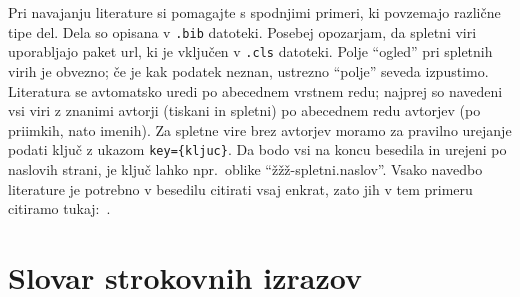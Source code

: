 \documentclass[mat1]{fmfdelo}
\begin{document}
Pri navajanju literature si pomagajte s spodnjimi primeri, ki povzemajo različne tipe del. Dela so opisana v \verb|.bib| datoteki.
Posebej opozarjam, da spletni viri uporabljajo paket url, ki je vključen v \verb|.cls| datoteki. Polje ``ogled'' pri spletnih virih je obvezno; če je kak podatek neznan, ustrezno ``polje'' seveda izpustimo. Literatura se avtomatsko uredi po abecednem vrstnem redu; najprej so navedeni vsi viri z znanimi avtorji (tiskani in spletni)  po abecednem redu avtorjev (po priimkih, nato imenih). Za spletne vire brez avtorjev moramo za pravilno urejanje podati ključ z ukazom \verb|key={kljuc}|. Da bodo vsi na koncu besedila in urejeni po naslovih strani, je ključ lahko npr.~oblike ``žžž-spletni.naslov''. 
Vsako navedbo literature je potrebno v besedilu citirati vsaj enkrat, zato jih v tem primeru citiramo tukaj:~\cite{angelini2011straight,globevniSkriptaWeb,lang2012fundamentals,lindic2007igra,spletMatrika,penttila2005flocks,spletSample,diplomaSample,conferenceSample,bookSample,clanekSample,velkovrh1974nekaj}.


\section*{Slovar strokovnih izrazov}









\end{document}

